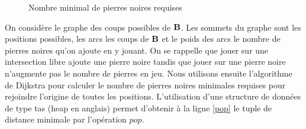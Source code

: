 \begin{figure}
\begin{subfigure}[b]{.4\textwidth}
{
} \end{subfigure}
\begin{subfigure}[b]{.4\textwidth}
\end{subfigure}
\caption{Nombre minimal de pierres noires requises}\label{fig:nombre-minimal-pierres}
\end{figure}

On considère le graphe des coups possibles de $\mathbf{B}$. Les sommets du graphe sont les positions possibles, les arcs les coups de $\mathbf{B}$ et le poids des arcs le nombre de pierres noires qu'on ajoute en y jouant. On se rappelle que jouer sur une intersection libre ajoute une pierre noire tandis que jouer sur une pierre noire n'augmente pas le nombre de pierres en jeu. Nous utilisons ensuite l'algorithme de Dijkstra pour calculer le nombre de pierres noires minimales requises pour rejoindre l'origine de toutes les positions. L'utilisation d'une structure de données de type tas (heap en anglais) permet d'obtenir à la ligne \ref{pop} le tuple de distance minimale par l'opération $pop$.

